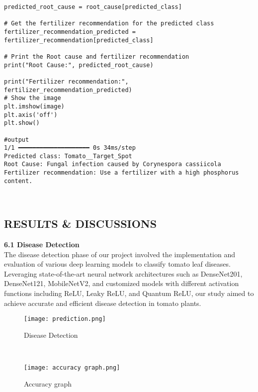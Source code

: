 \documentclass[12pt, English]{article}
\begin{document}
\begin{normalsize}
\begin{verbatim}
predicted_root_cause = root_cause[predicted_class]

# Get the fertilizer recommendation for the predicted class
fertilizer_recommendation_predicted = fertilizer_recommendation[predicted_class]

# Print the Root cause and fertilizer recommendation
print("Root Cause:", predicted_root_cause)

print("Fertilizer recommendation:", fertilizer_recommendation_predicted)
# Show the image
plt.imshow(image)
plt.axis('off')
plt.show()

#output
1/1 ━━━━━━━━━━━━━━━━━━━━ 0s 34ms/step
Predicted class: Tomato__Target_Spot
Root Cause: Fungal infection caused by Corynespora cassiicola
Fertilizer recommendation: Use a fertilizer with a high phosphorus content.



\end{verbatim}


\newpage
\begin{center}
\section{ \Large  RESULTS \& DISCUSSIONS}
\end{center}

\textbf{6.1 Disease Detection}\\
The disease detection phase of our project involved the implementation and evaluation of various deep learning models to classify tomato leaf diseases. Leveraging state-of-the-art neural network architectures such as DenseNet201, DenseNet121, MobileNetV2, and customized models with different activation functions including ReLU, Leaky ReLU, and Quantum ReLU, our study aimed to achieve accurate and efficient disease detection in tomato plants. \\
\begin{figure}[htb]
\begin{center}
\texttt{[image: prediction.png]}
\end{center}
\begin{center}
\renewcommand{\thefigure}{6.1.1}
\caption{\footnotesize Disease Detection}
\end{center}
\end{figure}\\

\begin{figure}[htb]
\begin{center}
\texttt{[image: accuracy graph.png]}
\end{center}
\begin{center}
\renewcommand{\thefigure}{6.1.2}
\caption{\footnotesize Accuracy graph}
\end{center}
\end{figure}\\


\end{normalsize}
\end{document}
